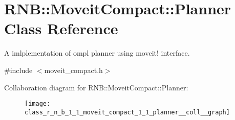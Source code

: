 \hypertarget{class_r_n_b_1_1_moveit_compact_1_1_planner}{}\section{R\+NB\+:\+:Moveit\+Compact\+:\+:Planner Class Reference}
\label{class_r_n_b_1_1_moveit_compact_1_1_planner}


A imlplementation of ompl planner using moveit! interface.  




{\ttfamily \#include $<$moveit\+\_\+compact.\+h$>$}



Collaboration diagram for R\+NB\+:\+:Moveit\+Compact\+:\+:Planner\+:
\nopagebreak
\begin{figure}[H]
\begin{center}
\leavevmode
\texttt{[image: class\_r\_n\_b\_1\_1\_moveit\_compact\_1\_1\_planner\_\_coll\_\_graph]}
\end{center}
\end{figure}
